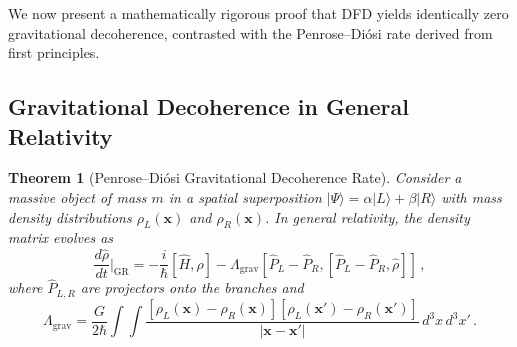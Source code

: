 \documentclass[aps,prl,twocolumn,superscriptaddress,nofootinbib,longbibliography]{revtex4-2}
\newtheorem{theorem}{Theorem}
\begin{document}
We now present a mathematically rigorous proof that DFD yields
identically zero gravitational decoherence, contrasted with the
Penrose--Di\'osi rate derived from first principles.

\subsection{Gravitational Decoherence in General Relativity}

\begin{theorem}[Penrose--Di\'osi Gravitational Decoherence Rate]
\label{thm:penrose}
Consider a massive object of mass $m$ in a spatial superposition
$|\Psi\rangle = \alpha|L\rangle + \beta|R\rangle$ with mass density
distributions $\rho_L(\mathbf{x})$ and $\rho_R(\mathbf{x})$.
In general relativity, the density matrix evolves as
\begin{equation}\label{eq:rho-GR}
\frac{d\hat{\rho}}{dt}\bigg|_{\text{GR}} =
-\frac{i}{\hbar}[\hat{H}, \hat{\rho}]
- \Lambda_{\text{grav}}
[\hat{P}_L - \hat{P}_R, [\hat{P}_L - \hat{P}_R, \hat{\rho}]]\,,
\end{equation}
where $\hat{P}_{L,R}$ are projectors onto the branches and
\begin{equation}\label{eq:Lambda-grav}
\Lambda_{\text{grav}} = \frac{G}{2\hbar}
\int\!\!\int \frac{[\rho_L(\mathbf{x}) - \rho_R(\mathbf{x})]
[\rho_L(\mathbf{x}') - \rho_R(\mathbf{x}')]}
{|\mathbf{x} - \mathbf{x}'|}\,d^3x\,d^3x'\,.
\end{equation}
\end{theorem}
\end{document}
